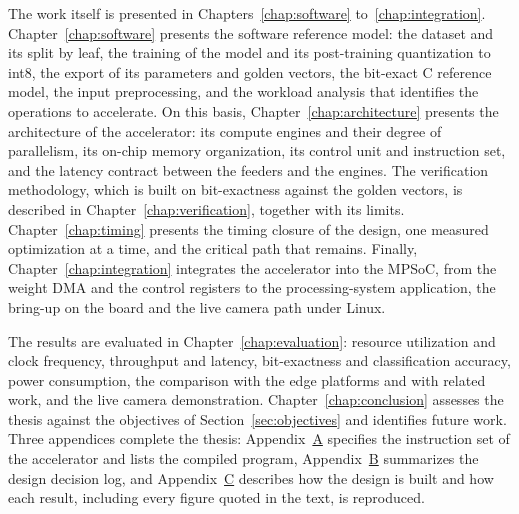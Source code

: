 The work itself is presented in
Chapters~\ref{chap:software} to~\ref{chap:integration}.
Chapter~\ref{chap:software} presents the software reference model: the
dataset and its split by leaf, the training of the model and its
post-training quantization to int8, the export of its parameters and golden
vectors, the bit-exact C reference model, the input preprocessing, and the
workload analysis that identifies the operations to accelerate. On this
basis, Chapter~\ref{chap:architecture} presents the architecture of the
accelerator: its compute engines and their degree of parallelism, its
on-chip memory organization, its control unit and instruction set, and the
latency contract between the feeders and the engines. The verification
methodology, which is built on bit-exactness against the golden vectors, is
described in Chapter~\ref{chap:verification}, together with its limits.
Chapter~\ref{chap:timing} presents the timing closure of the design, one
measured optimization at a time, and the critical path that remains.
Finally, Chapter~\ref{chap:integration} integrates the accelerator into the
MPSoC, from the weight DMA and the control registers to the
processing-system application, the bring-up on the board and the live
camera path under Linux.

The results are evaluated in Chapter~\ref{chap:evaluation}: resource
utilization and clock frequency, throughput and latency, bit-exactness and
classification accuracy, power consumption, the comparison with the edge
platforms and with related work, and the live camera demonstration.
Chapter~\ref{chap:conclusion} assesses the thesis against the objectives of
Section~\ref{sec:objectives} and identifies future work. Three appendices
complete the thesis: Appendix~\hyperref[appendix:isa]{A} specifies the
instruction set of the accelerator and lists the compiled program,
Appendix~\hyperref[appendix:decisions]{B} summarizes the design decision log,
and Appendix~\hyperref[appendix:reproduction]{C} describes how the design is
built and how each result, including every figure quoted in the text, is
reproduced.
